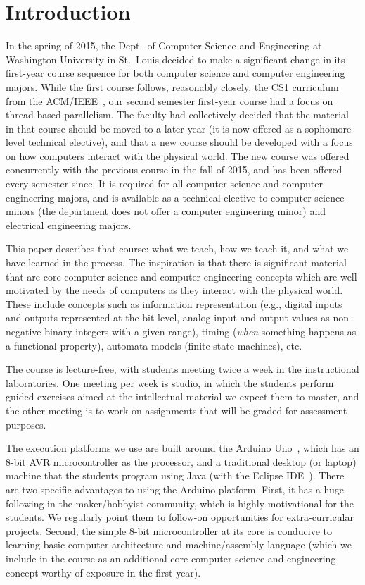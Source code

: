\section{Introduction}
\label{sec:intro}

In the spring of 2015, the Dept.~of Computer Science and Engineering at
Washington University in St.~Louis decided to make a significant change
in its first-year course sequence for both computer science and
computer engineering majors.  While the first course follows, reasonably
closely, the CS1 curriculum from the ACM/IEEE~\cite{cs13}, our second semester
first-year course had a focus on thread-based parallelism.  The faculty
had collectively decided that the material in that course should be moved
to a later year (it is now offered as a sophomore-level technical elective),
and that a new course should be developed with a focus on how computers
interact with the physical world.
The new course was offered concurrently with the previous course in the
fall of 2015, and has been offered every semester since.
It is required for all computer science and computer engineering majors,
and is available as a technical elective to computer science minors (the
department does not offer a computer engineering minor) and electrical
engineering majors.

This paper describes that course: what we teach, how we teach it, and
what we have learned in the process.
The inspiration is that there is significant material that are core
computer science and computer engineering concepts which are well motivated
by the needs of computers as they interact with the physical world.
These include concepts such as information representation (e.g., digital inputs
and outputs represented at the bit level, analog input and output values as
non-negative binary integers with a given range),
timing (\emph{when} something happens as a functional property),
automata models (finite-state machines), etc.

The course is lecture-free, with students meeting twice a week in the
instructional laboratories.  One meeting per week is studio, in which the
students perform guided exercises aimed at the intellectual material we
expect them to master, and the other meeting is to work on assignments
that will be graded for assessment purposes.

The execution platforms we use are built around the Arduino Uno~\cite{arduino},
which has an 8-bit AVR microcontroller as the processor,
and a traditional desktop (or laptop) machine that the
students program using Java (with the Eclipse IDE~\cite{eclipse}).
There are two specific advantages to using the Arduino platform.
First, it has a huge following in the maker/hobbyist community, which
is highly motivational for the students.  We regularly point them to
follow-on opportunities for extra-curricular projects.
Second, the simple 8-bit microcontroller at its core is conducive to
learning basic computer architecture and machine/assembly language
(which we include in the course as an additional core computer
science and engineering concept worthy of exposure in the first year).

